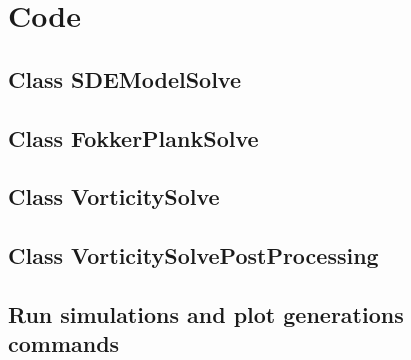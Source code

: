 \chapter{Code} \label{ch:SDEModelSolve.py}

\newpage
\section{Class SDEModelSolve} \label{appendix:SDEModelSolve}


\newpage
\section{Class FokkerPlankSolve} \label{appendix:FokkerPlankSolve}


\newpage
\section{Class VorticitySolve} \label{appendix:VorticitySolve}


\newpage
\section{Class VorticitySolvePostProcessing} \label{appendix:VorticitySolvePostProcessing}


\newpage
\section{Run simulations and plot generations commands} \label{appendix:run_simulations}

